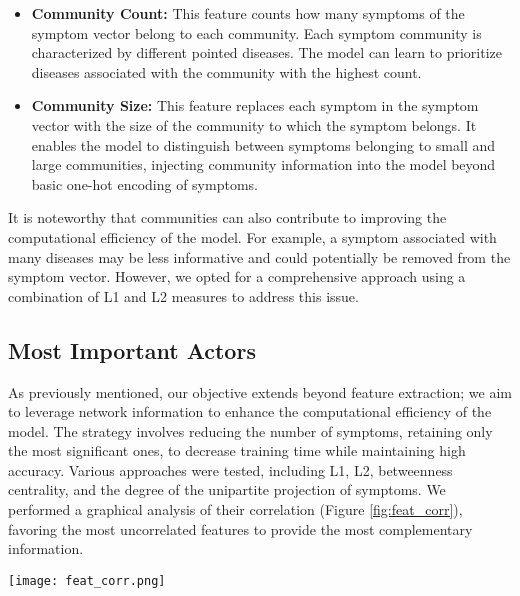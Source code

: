 \begin{itemize}
    \setlength\itemsep{1em} %

    \item \textbf{Community Count:} This feature counts how many symptoms of the symptom vector belong to each community.
          Each symptom community is characterized by different pointed diseases. The model can learn to prioritize
          diseases associated with the community with the highest count.

    \item \textbf{Community Size:} This feature replaces each symptom in the symptom vector with the size of the
          community to which the symptom belongs. It enables the model to distinguish between symptoms belonging to small and
          large communities, injecting community information into the model beyond basic one-hot encoding of symptoms.
\end{itemize}
\noindent
\vspace{0.4cm}
It is noteworthy that communities can also contribute to improving the computational efficiency of the model.
For example, a symptom associated with many diseases may be less informative and could potentially be removed from the
symptom vector. However, we opted for a comprehensive approach using a combination of L1 and L2 measures to address this issue.


\subsection{Most Important Actors}
\label{subsec:most_important_actors}

As previously mentioned, our objective extends beyond feature extraction; we aim to leverage network information to
enhance the computational efficiency of the model. The strategy involves reducing the number of symptoms,
retaining only the most significant ones, to decrease training time while maintaining high accuracy.
Various approaches were tested, including L1, L2, betweenness centrality, and the degree of the unipartite projection
of symptoms. We performed a graphical analysis of their correlation (Figure \ref{fig:feat_corr}), favoring the
most uncorrelated features to provide the most complementary information.

\begin{figure*}[!htb]
    \centering
    \texttt{[image: feat\_corr.png]}
    \caption{Correlation between features}
    \label{fig:feat_corr}
\end{figure*}

